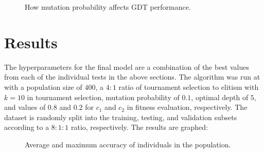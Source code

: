 \documentclass[12pt]{article}
\begin{document}
\begin{figure}[H]
    \centering
    \caption{How mutation probability affects GDT performance.}
\end{figure}

\section{Results}

The hyperparameters for the final model are a combination of the best values from each of the individual tests in the above sections. The algorithm was run at with a population size of $400$, a $4:1$ ratio of tournament selection to elitism with $k=10$ in tournament selection, mutation probability of $0.1$, optimal depth of $5$, and values of $0.8$ and $0.2$ for $c_1$ and $c_2$ in fitness evaluation, respectively. The dataset is randomly split into the training, testing, and validation subsets according to a $8:1:1$ ratio, respectively. The results are graphed:

\begin{figure}[H]
    \centering
    \caption{Average and maximum accuracy of individuals in the population.}
\end{figure}
\end{document}
